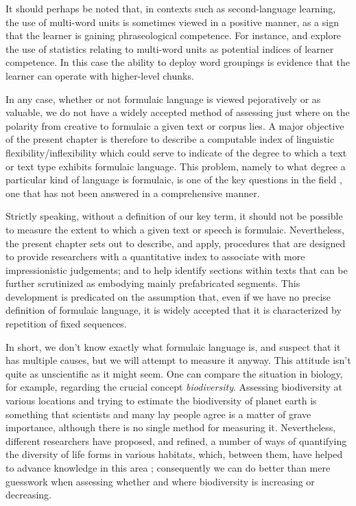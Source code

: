 \documentclass[output=paper]{langscibook}
\begin{document}
It should perhaps be noted that, in contexts such as second-language learning, the use of multi-word units is sometimes viewed in a positive manner, as a sign that the learner is gaining phraseological competence. For instance, \citet{GrangerBestgen2014} and \citet{Leńko-Szymańska2016} explore the use of statistics relating to multi-word units as potential indices of learner competence. In this case the ability to deploy word groupings is evidence that the learner can operate with higher-level chunks.

In any case, whether or not formulaic language is viewed pejoratively or as valuable, we do not have a widely accepted method of assessing just where on the polarity from creative to formulaic a given text or corpus lies. A major objective of the present chapter is therefore to describe a computable index of linguistic flexibility\slash inflexibility which could serve to indicate of the degree to which a text or text type exhibits formulaic language. This problem, namely to what degree a particular kind of language is formulaic, is one of the key questions in the field \citep[4]{Wray2002}, one that has not been answered in a comprehensive manner.

Strictly speaking, without a definition of our key term, it should not be possible to measure the extent to which a given text or speech is formulaic. Nevertheless, the present chapter sets out to describe, and apply, procedures that are designed to provide researchers with a quantitative index to associate with more impressionistic judgements; and to help identify sections within texts that can be further scrutinized as embodying mainly prefabricated segments. This development is predicated on the assumption that, even if we have no precise definition of formulaic language, it is widely accepted that it is characterized by repetition of fixed sequences.

In short, we don't know exactly what formulaic language is, and suspect that it has multiple causes, but we will attempt to measure it anyway. This attitude isn't quite as unscientific as it might seem. One can compare the situation in biology, for example, regarding the crucial concept \textit{biodiversity}. Assessing biodiversity at various locations and trying to estimate the biodiversity of planet earth is something that scientists and many lay people agree is a matter of grave importance, although there is no single method for measuring it. Nevertheless, different researchers have proposed, and refined, a number of ways of quantifying the diversity of life forms in various habitats, which, between them, have helped to advance knowledge in this area \citep{Magurran2004}; consequently we can do better than mere guesswork when assessing whether and where biodiversity is increasing or decreasing.
\end{document}
